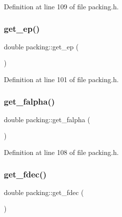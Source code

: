 Definition at line 109 of file packing.\+h.

\mbox{\label{classpacking_abe5e5105ed2b581e64f0ba5608e2ccb6}} 
\subsubsection{\texorpdfstring{get\+\_\+ep()}{get\_ep()}}
{\footnotesize\ttfamily double packing\+::get\+\_\+ep (\begin{DoxyParamCaption}{ }\end{DoxyParamCaption})\hspace{0.3cm}{\ttfamily [inline]}}



Definition at line 101 of file packing.\+h.

\mbox{\label{classpacking_a0c8cad7afd9da1c30856b1201be15535}} 
\subsubsection{\texorpdfstring{get\+\_\+falpha()}{get\_falpha()}}
{\footnotesize\ttfamily double packing\+::get\+\_\+falpha (\begin{DoxyParamCaption}{ }\end{DoxyParamCaption})\hspace{0.3cm}{\ttfamily [inline]}}



Definition at line 108 of file packing.\+h.

\mbox{\label{classpacking_a2b4e47ab0671d9ee9892495df465be17}} 
\subsubsection{\texorpdfstring{get\+\_\+fdec()}{get\_fdec()}}
{\footnotesize\ttfamily double packing\+::get\+\_\+fdec (\begin{DoxyParamCaption}{ }\end{DoxyParamCaption})\hspace{0.3cm}{\ttfamily [inline]}}



